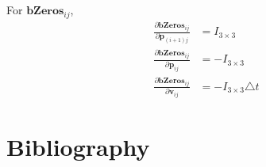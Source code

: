 \documentclass[12pt]{article}   %
\begin{document}
\begin{appendices}
For $\textbf{bZeros}_{ij}$,
\begin{align}
\frac{\partial \textbf{bZeros}_{ij}}{\partial \textbf{p}_{(i+1)j}} &= I_{3\times 3} \\
\frac{\partial \textbf{bZeros}_{ij}}{\partial \textbf{p}_{ij}} &= - I_{3\times 3} \\
\frac{\partial \textbf{bZeros}_{ij}}{\partial \textbf{v}_{ij}} &= - I_{3\times 3} \triangle t  
\end{align}


	
\end{appendices}

\newpage 
\section{Bibliography}
\label{Bibliography}



\end{document}
